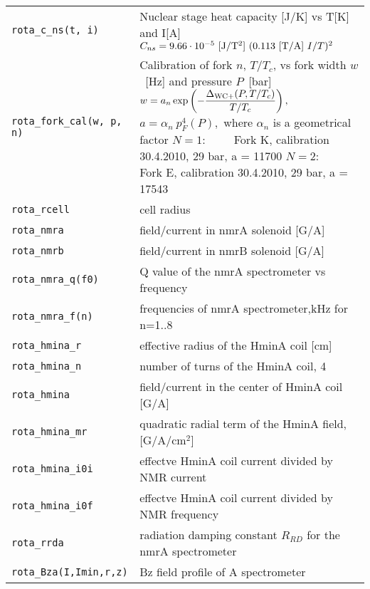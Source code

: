 \documentclass[a4paper]{article}
\begin{document}
\medskip
\noindent\begin{tabular}{lp{11cm}}
\tt rota\_c\_ns(t, i) &Nuclear stage heat capacity [J/K] vs T[K] and I[A]\newline
   $C_{ns} = 9.66 \cdot 10^{-5}\ {\rm [J/T^2]} \ (0.113\ {\rm [T/A]}\  I/T)^2$\\

\tt rota\_fork\_cal(w, p, n) &Calibration of fork $n$, $T/T_c$, vs fork width $w$~[Hz] and pressure $P$~[bar]\newline
   $\displaystyle w = a_n
     \exp\left(-\frac{\Delta_{\rm WC+}(P, T/T_c)}{T/T_c}\right),$\newline
   $a = \alpha_n \ p_F^4(P),$ where $\alpha_n$ is a geometrical factor\newline
   $N=1:\qquad $ Fork K, calibration 30.4.2010, 29 bar, a = 11700\newline
   $N=2:\qquad $ Fork E, calibration 30.4.2010, 29 bar, a = 17543\\

\tt rota\_rcell     & cell radius\\
\tt rota\_nmra      & field/current in nmrA solenoid [G/A]\\
\tt rota\_nmrb      & field/current in nmrB solenoid [G/A]\\
\tt rota\_nmra\_q(f0) & Q value of the nmrA spectrometer vs frequency\\
\tt rota\_nmra\_f(n)  & frequencies of nmrA spectrometer,kHz for n=1..8\\
\tt rota\_hmina\_r  & effective radius of the HminA coil [cm]\\
\tt rota\_hmina\_n  & number of turns of the HminA coil, 4\\
\tt rota\_hmina     & field/current in the center of HminA coil [G/A]\\
\tt rota\_hmina\_mr & quadratic radial term of the HminA field, [G/A/cm$^2$]\\
\tt rota\_hmina\_i0i& effectve HminA coil current divided by NMR current\\
\tt rota\_hmina\_i0f& effectve HminA coil current divided by NMR frequency\\
\tt rota\_rrda      & radiation damping constant $R_{RD}$ for the nmrA spectrometer\\
\tt rota\_Bza(I,Imin,r,z) & Bz field profile of A spectrometer\\
\end{tabular}

\eject
\end{document}
